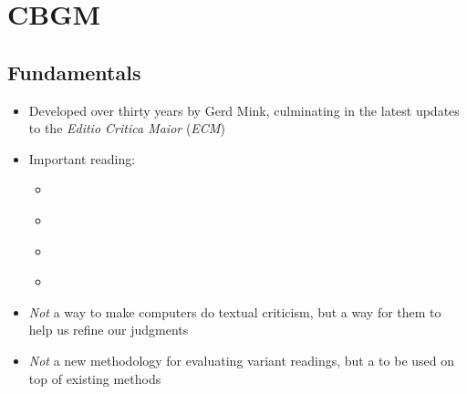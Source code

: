 \documentclass[10pt]{beamer}
\begin{document}
	\section{CBGM}
	\subsection{Fundamentals}
	\begin{frame}
		\begin{itemize}
			\item Developed over thirty years by Gerd Mink, culminating in the latest updates to the \emph{Editio Critica Maior} (\emph{ECM})
			\item Important reading:
			\begin{itemize} 
				\item \cite{Mink04}
				\item \cite{Gurry17}
				\item \cite{WG17}
				\item \cite{Edmondson19}
			\end{itemize}
		\end{itemize}
	\end{frame}
	\begin{frame}
		\begin{itemize}
			\item \emph{Not} a way to make computers do textual criticism, but a way for them to help us refine our judgments
			\item \emph{Not} a new methodology for evaluating variant readings, but a  to be used on top of existing methods
		\end{itemize}
	\end{frame}
\end{document}
